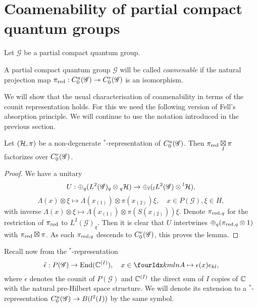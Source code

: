 \section{Coamenability of partial compact quantum groups}

Let $\mathscr{G}$ be a partial compact quantum group. 


\begin{Def} A partial compact quantum group $\mathscr{G}$ will be called \emph{coamenable} if the natural projection map $\pi_{\operatorname{\mathrm{red}}}:C^{u}_{0}(\mathscr{G})\twoheadrightarrow C^{r}_{0}(\mathscr{G})$ is an isomorphism.
\end{Def}


We will show that the usual characterisation of coamenability in terms of the counit representation holds. For this we need the following version of Fell's absorption principle. We will continue to use the notation introduced in the previous section.

\begin{Lem}\label{LemFell} Let $(\mathcal{H},\pi)$ be a non-degenerate $^*$-representation of $C^{u}_{0}(\mathscr{G})$. Then $\pi_{\operatorname{\mathrm{red}}}\underset{I}{\boxtimes} \pi$ factorizes over $C^{r}_{0}(\mathscr{G})$.
\end{Lem}

\begin{proof}  We have a unitary \[U: \oplus_q (L^2(\mathscr{G})_q\otimes {}_q\mathcal{H} ) \rightarrow \oplus_l ({}_l L^2(\mathscr{G})\otimes {}^l\mathcal{H}),\]\[\Lambda(x)\otimes \xi \mapsto \Lambda(x_{(1)})\otimes \pi(x_{(2)})\xi,\quad x\in P(\mathscr{G}),\xi\in H,\] with inverse $\Lambda(x)\otimes \xi \mapsto \Lambda(x_{(1)})\otimes \pi(S(x_{(2)}))\xi$. %
Denote $\pi_{\operatorname{\mathrm{red}},q}$ for the restriction of $\pi_{\operatorname{\mathrm{red}}}$ to $L^2(\mathscr{G})_q$. Then it is clear that $U$ intertwines $\oplus_q (\pi_{\operatorname{\mathrm{red}},q}\otimes 1)$ with $\pi_{\operatorname{\mathrm{red}}}\boxtimes \pi$. As each $\pi_{\operatorname{\mathrm{red}},q}$ descends to $C^{r}_{0}(\mathscr{G})$, this proves the lemma.
\end{proof} 

Recall now from \cite{DCT1} the $^*$-representation \[\weps: P(\mathscr{G}) \rightarrow \End(\C^{(I)}), \quad x\in \Gr{A}{k}{l}{m}{n}\mapsto \epsilon(x) e_{kl},\]
where $\epsilon$ denotes the counit of $P(\mathscr{G})$ and $\mathbb{C}^{(I)}$ the direct sum of $I$ copies of $\mathbb{C}$ with the natural pre-Hilbert space structure. We will denote its extension to a $^*$-representation $C^{u}_{0}(\mathscr{G})\rightarrow B(l^2(I))$ by the same symbol.

